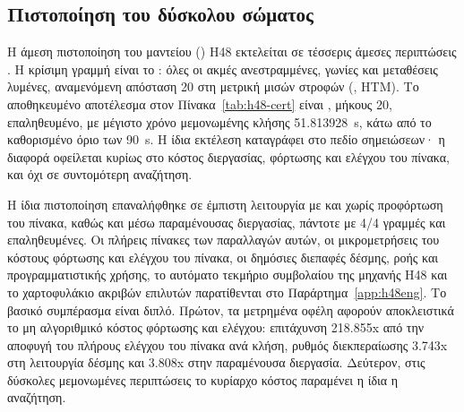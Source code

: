 \begin{table}[htbp]\centering

\caption[Αποτελέσματα πίεσης της μηχανής H48 με τον πίνακα h48h7]{Αποτελέσματα πίεσης της μηχανής H48 με τον πίνακα : 15/15 γραμμές , συμπεριλαμβανομένων δέκα ντετερμινιστικών περιπτώσεων ονομαστικού βάθους 25. Πηγή: .}
\label{tab:h48h7-stress}
\end{table}

\subsection{Πιστοποίηση του δύσκολου σώματος}
\label{sec:experiments-h48-cert}

Η άμεση πιστοποίηση του μαντείου () H48 εκτελείται σε τέσσερις άμεσες περιπτώσεις . Η κρίσιμη γραμμή είναι το : όλες οι ακμές ανεστραμμένες, γωνίες και μεταθέσεις λυμένες, αναμενόμενη απόσταση 20 στη μετρική μισών στροφών (, HTM). Το αποθηκευμένο αποτέλεσμα στον Πίνακα~\ref{tab:h48-cert} είναι , μήκους 20, επαληθευμένο, με μέγιστο χρόνο μεμονωμένης κλήσης 51.813928~s, κάτω από το καθορισμένο όριο των 90~s. Η ίδια εκτέλεση καταγράφει  στο πεδίο σημειώσεων· η διαφορά οφείλεται κυρίως στο κόστος διεργασίας, φόρτωσης και ελέγχου του πίνακα, και όχι σε συντομότερη αναζήτηση.

\begin{table}[htbp]\centering

\caption[Πιστοποίηση του μαντείου H48 σε ελεγχόμενη λειτουργία]{Πιστοποίηση του μαντείου H48 σε ελεγχόμενη λειτουργία (όριο 90~s): τέσσερις άμεσες περιπτώσεις, όλες  και επαληθευμένες, με το superflip σε απόσταση 20. Πηγή: .}
\label{tab:h48-cert}
\end{table}

Η ίδια πιστοποίηση επαναλήφθηκε σε έμπιστη λειτουργία με και χωρίς προφόρτωση του πίνακα, καθώς και μέσω παραμένουσας διεργασίας, πάντοτε με 4/4 γραμμές  και επαληθευμένες. Οι πλήρεις πίνακες των παραλλαγών αυτών, οι μικρομετρήσεις του κόστους φόρτωσης και ελέγχου του πίνακα, οι δημόσιες διεπαφές δέσμης, ροής και προγραμματιστικής χρήσης, το αυτόματο τεκμήριο συμβολαίου της μηχανής H48 και το χαρτοφυλάκιο ακριβών επιλυτών παρατίθενται στο Παράρτημα~\ref{app:h48eng}. Το βασικό συμπέρασμα είναι διπλό. Πρώτον, τα μετρημένα οφέλη αφορούν αποκλειστικά το μη αλγοριθμικό κόστος φόρτωσης και ελέγχου: επιτάχυνση 218.855x από την αποφυγή του πλήρους ελέγχου του πίνακα ανά κλήση, ρυθμός διεκπεραίωσης 3.743x στη λειτουργία δέσμης και 3.808x στην παραμένουσα διεργασία. Δεύτερον, στις δύσκολες μεμονωμένες περιπτώσεις το κυρίαρχο κόστος παραμένει η ίδια η αναζήτηση.

